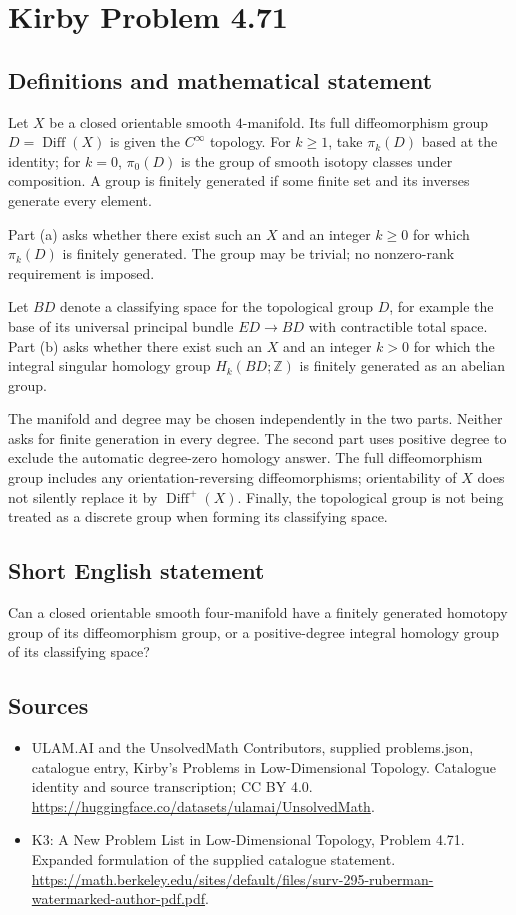 \documentclass[11pt,a4paper]{article}
\begin{document}
\section*{Kirby Problem 4.71}\label{statement}

\subsection{Definitions and mathematical statement}
Let $X$ be a closed orientable smooth $4$-manifold.
Its full diffeomorphism group $D=\operatorname{Diff}(X)$ is given
the $C^\infty$ topology. For $k\ge1$, take $\pi_k(D)$ based at
the identity; for $k=0$, $\pi_0(D)$ is the group of smooth
isotopy classes under composition. A group is finitely generated
if some finite set and its inverses generate every element.

Part (a) asks whether there exist such an $X$ and an integer
$k\ge0$ for which $\pi_k(D)$ is finitely generated. The group
may be trivial; no nonzero-rank requirement is imposed.

Let $BD$ denote a classifying space for the topological group $D$,
for example the base of its universal principal bundle $ED\to BD$
with contractible total space. Part (b) asks whether there exist
such an $X$ and an integer $k>0$ for which the integral singular
homology group $H_k(BD;\mathbb Z)$ is finitely generated as an
abelian group.

The manifold and degree may be chosen independently in the two
parts. Neither asks for finite generation in every degree. The
second part uses positive degree to exclude the automatic degree-zero
homology answer. The full diffeomorphism group includes any
orientation-reversing diffeomorphisms; orientability of $X$ does not
silently replace it by $\operatorname{Diff}^+(X)$. Finally, the
topological group is not being treated as a discrete group when
forming its classifying space.
\subsection{Short English statement}
Can a closed orientable smooth four-manifold have a finitely generated homotopy group of its diffeomorphism group, or a positive-degree integral homology group of its classifying space?
\subsection{Sources}
\begin{itemize}
\item[S1] ULAM.AI and the UnsolvedMath Contributors, supplied problems.json, catalogue entry, Kirby's Problems in Low-Dimensional Topology. Catalogue identity and source transcription; CC BY 4.0.
\url{https://huggingface.co/datasets/ulamai/UnsolvedMath}.
\item[S2] K3: A New Problem List in Low-Dimensional Topology, Problem 4.71. Expanded formulation of the supplied catalogue statement.
\url{https://math.berkeley.edu/sites/default/files/surv-295-ruberman-watermarked-author-pdf.pdf}.
\end{itemize}
\end{document}
